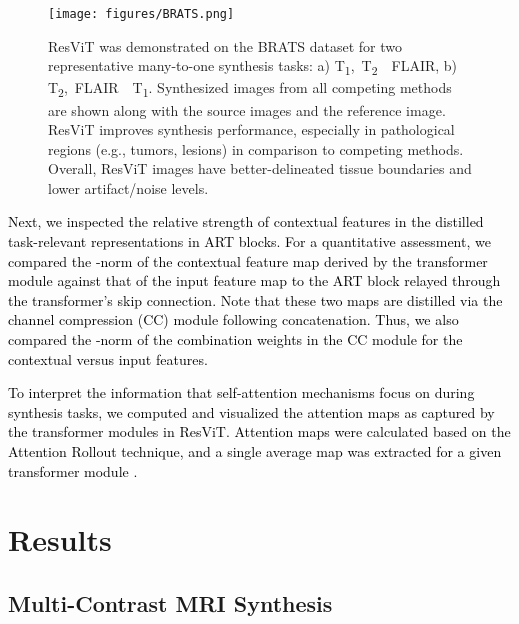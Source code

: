 \documentclass[journal,twoside,web]{ieeecolor}
\newcommand{\TtwoFlairTone}{T\textsubscript{2},~FLAIR~~T\textsubscript{1}}
\newcommand{\ToneTtwoFlair}{T\textsubscript{1},~T\textsubscript{2}~~FLAIR}
\newcommand*{\revhl}{\textcolor{black}}
\begin{document}
  
\begin{figure*}[t!]
\vspace{-1ex}
\texttt{[image: figures/BRATS.png]}
\caption{ResViT was demonstrated on the BRATS dataset for two representative many-to-one synthesis tasks: a) \ToneTtwoFlair, b) \TtwoFlairTone. Synthesized images from all competing methods are shown along with the source images and the reference image. ResViT improves synthesis performance, especially in pathological regions (e.g., tumors, lesions) in comparison to competing methods. Overall, ResViT images have better-delineated tissue boundaries and lower artifact/noise levels.}
\label{fig:brats_many}
\vspace{-3.5ex}
\end{figure*}

 \revhl{Next, we inspected the relative strength of contextual features in the distilled task-relevant representations in ART blocks. For a quantitative assessment, we compared the -norm of the contextual feature map derived by the transformer module against that of the input feature map to the ART block relayed through the transformer's skip connection. Note that these two maps are distilled via the channel compression (CC) module following concatenation. Thus, we also compared the -norm of the combination weights in the CC module for the contextual versus input features.}
\par
\revhl{To interpret the information that self-attention mechanisms focus on during synthesis tasks, we computed and visualized the attention maps as captured by the transformer modules in ResViT. Attention maps were calculated based on the Attention Rollout technique, and a single average map was extracted for a given transformer module \cite{rollout}.}

\section{Results}
\subsection{Multi-Contrast MRI Synthesis}
\end{document}
